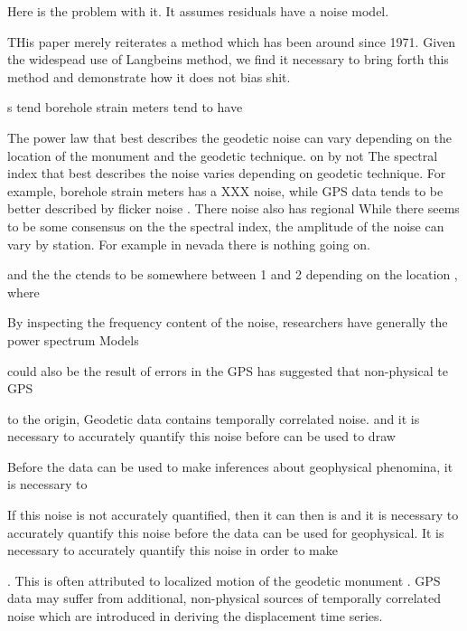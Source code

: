 \documentclass[10pt,a4paper]{article}
\begin{document}
Here is the problem with it. It assumes residuals have a noise model. 

THis paper merely reiterates a method which has been around since 1971.  Given the widespead use of Langbeins method, we find it necessary to bring forth this method and demonstrate how it does not bias shit. 

    

  

s tend  borehole strain meters tend to have    

The power law that best describes the geodetic noise can  vary depending on the location of the monument and the geodetic technique. on  by  not The spectral index that best describes the noise varies depending on geodetic technique.  For example, borehole strain meters has a XXX noise, while GPS data tends to be better described by flicker noise \citep{Zhang1997,Mao1999}. There noise also has regional    While there seems to be some consensus on the the spectral index, the amplitude of the noise can vary by station. For example in nevada there is nothing going on.

  

     and the the    ctends to be somewhere between 1 and 2 depending on the location \citep{Langbein2008} , where     \citep{Mao1999}        

By inspecting the frequency content of the noise, researchers have generally  the power spectrum Models   

   could also be the result of errors in the GPS has suggested that non-physical te GPS    

to the  origin, Geodetic data contains temporally correlated noise. and it is necessary to accurately quantify this noise before can be used to draw 
 
Before the data can be used to make inferences about geophysical phenomina, it is necessary to 

If this noise is not accurately quantified, then it can then is  and it is necessary to accurately quantify this noise before the data can be used for geophysical. It is necessary to accurately quantify this noise in order to make 

 \citep{Langbein1997,Zhang1997,Mao1999}. This is often attributed to localized motion of the geodetic monument \citep[e.g][]{Wyatt1982,Wyatt1989,Agnew1992,King2009}. GPS data may suffer from additional, non-physical sources of temporally correlated noise which are introduced in deriving the displacement time series.  
\end{document}
